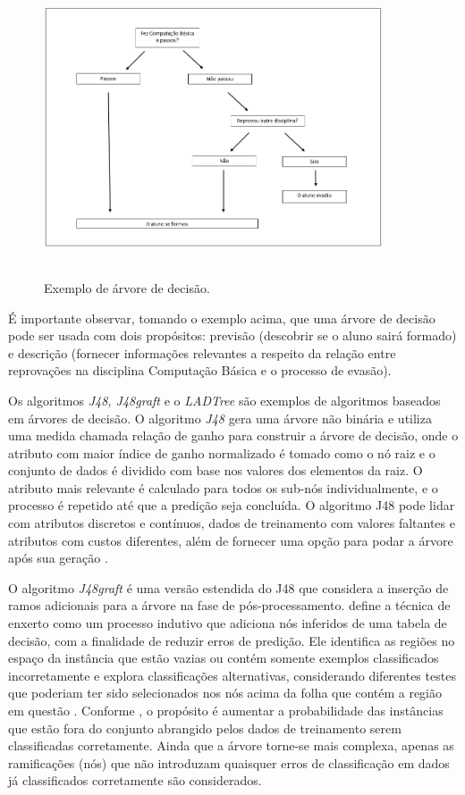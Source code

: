 \begin{figure}[!htb]
	\centering
	{\includegraphics[width=10cm, height=8cm]{images/imagem7}}
	\caption {Exemplo de árvore de decisão.}
	\label{arvore_decisao}
\end{figure}

É importante observar, tomando o exemplo acima, que uma árvore de decisão pode ser usada com dois propósitos: previsão (descobrir se o aluno sairá formado) e descrição (fornecer informações relevantes a respeito da relação entre reprovações na disciplina Computação Básica e o processo de evasão).

Os algoritmos \textit{J48, J48graft} e o \textit{LADTree} são exemplos de algoritmos baseados em árvores de decisão. O algoritmo \textit{J48} gera uma árvore não binária e utiliza uma medida chamada relação de ganho para construir a árvore de decisão, onde o atributo com maior índice de ganho normalizado é tomado como o nó raiz e o conjunto de dados é dividido com base nos valores dos elementos da raiz. O atributo mais relevante é calculado para todos os sub-nós individualmente, e o processo é repetido até que a predição seja concluída. O algoritmo J48 pode lidar com atributos discretos e contínuos, dados de treinamento com valores faltantes e atributos com custos diferentes, além de fornecer uma opção para podar a árvore após sua geração \citep{rajput_arora}. 

O algoritmo \textit{J48graft} é uma versão estendida do J48 que considera a inserção de ramos adicionais para a árvore na fase de pós-processamento. \citet{wisaeng} define a técnica de enxerto como um processo indutivo que adiciona nós inferidos de uma tabela de decisão, com a finalidade de reduzir erros de predição. Ele identifica as regiões no espaço da instância que estão vazias ou contém somente exemplos classificados incorretamente e explora classificações alternativas, considerando diferentes testes que poderiam ter sido selecionados nos nós acima da folha que contém a região em questão \citep{witten2005}. Conforme \citet{rajput_arora}, o propósito é aumentar a probabilidade das instâncias que estão fora do conjunto abrangido pelos dados de treinamento serem classificadas corretamente. Ainda que a árvore torne-se mais complexa, apenas as ramificações (nós) que não introduzam quaisquer erros de classificação em dados já classificados corretamente são considerados.

